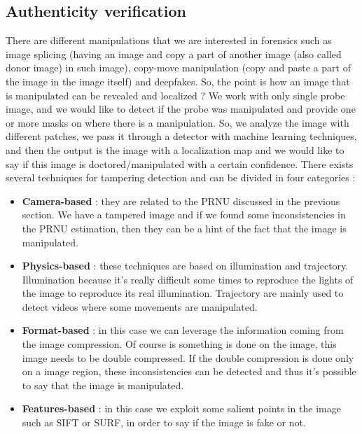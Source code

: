 \documentclass[11pt]{article}
\begin{document}
\subsection{Authenticity verification}
There are different manipulations that we are interested in forensics such as image splicing (having an image and copy a part of another image (also called donor image) in such image), copy-move manipulation (copy and paste a part of the image in the image itself) and deepfakes. So, the point is how an image that is manipulated can be revealed and localized ? We work with only single probe image, and we would like to detect if the probe was manipulated and provide one or more masks on where there is a manipulation. So, we analyze the image with different patches, we pass it through a detector with machine learning techniques, and then the output is the image with a localization map and we would like to say if this image is doctored/manipulated with a certain confidence. There exists several techniques for tampering detection and can be divided in four categories :

\begin{itemize}
\item \textbf{Camera-based} : they are related to the PRNU discussed in the previous section. We have a tampered image and if we found some inconsistencies in the PRNU estimation, then they can be a hint of the fact that the image is manipulated.

\item \textbf{Physics-based} : these techniques are based on illumination and trajectory. Illumination because it's really difficult some times to reproduce the lights of the image to reproduce its real illumination. Trajectory are mainly used to detect videos where some movements are manipulated.

\item \textbf{Format-based} : in this case we can leverage the information coming from the image compression. Of course is something is done on the image, this image needs to be double compressed. If the double compression is done only on a image region, these inconsistencies can be detected and thus it's possible to say that the image is manipulated.

\item \textbf{Features-based} : in this case we exploit some salient points in the image such as SIFT or SURF, in order to say if the image is fake or not.
\end{itemize}
\end{document}
